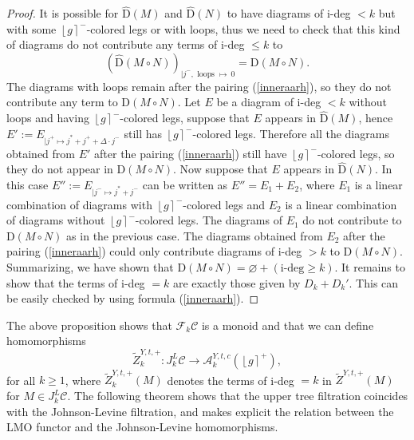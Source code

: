 \documentclass[10pt]{amsart}
\numberwithin{equation}{section}
\numberwithin{equation}{section}
\theoremstyle{definition}
\begin{document}
\begin{proof}
\noindent It is possible for $\hat{\text{D}}(M)$ and $\hat{\text{D}}(N)$ to have  diagrams of i-deg $<k$ but with some $\left\lfloor g\right\rceil^-$-colored legs or with loops, thus we need to check that this kind of  diagrams do not contribute any  terms of i-deg $\leq k$ to
 $$(\hat{\text{D}}(M\circ N))_{|j^-,\text{\ loops\ }\mapsto\  0}=\text{D}(M\circ N).$$
 The diagrams with loops remain after the pairing (\ref{inneraarh}), so they do not contribute any term to $\text{D}(M\circ N)$. Let $E$ be a diagram of i-deg $<k$ without loops and having  $\left\lfloor g\right\rceil^-$-colored legs, suppose that $E$ appears in $\hat{\text{D}}(M)$, hence $E':=E_{|j^+\mapsto j^*+j^+ +{\Delta}\cdot j^-}$  still has $\left\lfloor g\right\rceil^-$-colored legs. Therefore all the diagrams obtained from $E'$  after the pairing (\ref{inneraarh}) still have $\left\lfloor g\right\rceil^-$-colored legs, so they do not appear in $\text{D}(M\circ N)$.  Now suppose that  $E$ appears in $\hat{\text{D}}(N)$. In this case $E'':=E_{|j^-\mapsto j^*+j^-}$ can be written as $E''=E_1+E_2$, where $E_1$ is a linear combination of diagrams with $\left\lfloor g\right\rceil^-$-colored legs and $E_2$ is a linear combination of diagrams without $\left\lfloor g\right\rceil^-$-colored legs. The diagrams of $E_1$  do not contribute to $\text{D}(M\circ N)$ as in the previous case. The diagrams obtained from  $E_2$ after the pairing (\ref{inneraarh}) could only contribute diagrams of i-deg $>k$ to $\text{D}(M\circ N)$. Summarizing, we have shown that $\text{D}(M\circ N)=\varnothing + (\text{i-deg}\geq k)$. It remains to show that the terms of i-deg $=k$ are exactly those given by $D_k+D_k'$. This can be easily checked  by using  formula (\ref{inneraarh}).
\end{proof}

The above proposition shows that $\mathcal{F}_k \mathcal{C}$ is a monoid and that we can define homomorphisms 
$$\widetilde{Z}^{Y,t,+}_k:J_k^L\mathcal{C}\longrightarrow\mathcal{A}_k^{Y,t,c}(\left\lfloor g\right\rceil^+),$$
for all $k\geq1$, where  $\widetilde{Z}^{Y,t,+}_k(M)$  denotes the terms of i-deg $=k$ in $\widetilde{Z}^{Y,t,+}(M)$ for  $M\in J_k^L\mathcal{C}$. The following theorem shows that the upper tree filtration coincides with the Johnson-Levine filtration, and makes explicit the relation between the LMO functor and the Johnson-Levine homomorphisms. 
\end{document}
